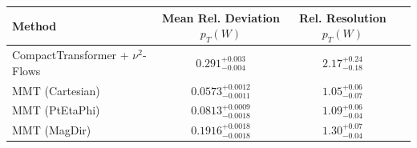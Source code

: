     \begin{tabular}{lccc}
        \toprule
        Method & Mean Rel. Deviation $p_{T}(W)$ & Rel. Resolution $p_{T}(W)$ \\
        \midrule
        CompactTransformer + $\nu^2$-Flows & $0.291^{+0.003}_{-0.004}$ & $2.17^{+0.24}_{-0.18}$ \\
        MMT (Cartesian) & $0.0573^{+0.0012}_{-0.0011}$ & $1.05^{+0.06}_{-0.07}$ \\
        MMT (PtEtaPhi) & $0.0813^{+0.0009}_{-0.0018}$ & $1.09^{+0.06}_{-0.04}$ \\
        MMT (MagDir) & $0.1916^{+0.0018}_{-0.0018}$ & $1.30^{+0.07}_{-0.04}$ \\
        \bottomrule
    \end{tabular}